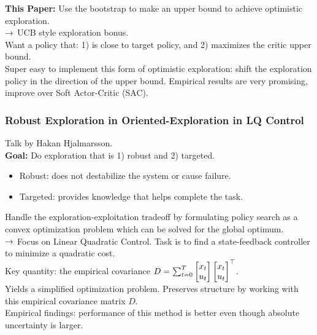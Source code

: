 {\bf This Paper:} Use the bootstrap to make an upper bound to achieve optimistic exploration. \\

$\rightarrow$ UCB style exploration bonus. \\

Want a policy that: 1) is close to target policy, and 2) maximizes the critic upper bound. \\

Super easy to implement this form of optimistic exploration: shift the exploration policy in the direction of the upper bound. Empirical results are very promising, improve over Soft Actor-Critic (SAC). 

\subsubsection{Robust Exploration in Oriented-Exploration in LQ Control}

Talk by Hakan Hjalmarsson. \\

{\bf Goal:} Do exploration that is 1) robust and 2) targeted.
\begin{itemize}
    \item Robust: does not destabilize the system or cause failure.
    \item Targeted: provides knowledge that helps complete the task.
\end{itemize}

Handle the exploration-exploitation tradeoff by formulating policy search as a convex optimization problem which can be solved for the global optimum. \\

$\rightarrow$ Focus on Linear Quadratic Control. Task is to find a state-feedback controller to minimize a quadratic cost. \\

Key quantity: the empirical covariance $D = \sum_{t=0}^T \begin{bmatrix}x_t \\ u_t\end{bmatrix} \begin{bmatrix}x_t \\ u_t\end{bmatrix}^\top$. \\

Yields a simplified optimization problem. Preserves structure by working with this empirical covariance matrix $D$. \\

Empirical findings: performance of this method is better even though absolute uncertainty is larger. \\


